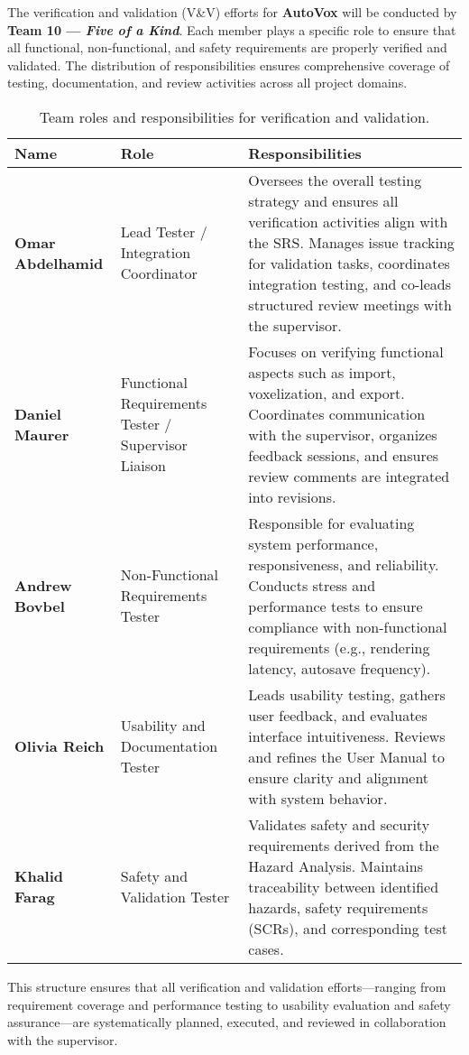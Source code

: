 \documentclass[12pt, titlepage]{article}
\begin{document}
The verification and validation (V\&V) efforts for \textbf{AutoVox} will be conducted by \textbf{Team 10 --- \textit{Five of a Kind}}. Each member plays a specific role to ensure that all functional, non-functional, and safety requirements are properly verified and validated. The distribution of responsibilities ensures comprehensive coverage of testing, documentation, and review activities across all project domains.

\begin{table}[H]
\centering
\begin{tabular}{|p{3.5cm}|p{4cm}|p{7cm}|}
\hline
\textbf{Name} & \textbf{Role} & \textbf{Responsibilities} \\
\hline
\textbf{Omar Abdelhamid} & Lead Tester / Integration Coordinator & Oversees the overall testing strategy and ensures all verification activities align with the SRS. Manages issue tracking for validation tasks, coordinates integration testing, and co-leads structured review meetings with the supervisor. \\
\hline
\textbf{Daniel Maurer} & Functional Requirements Tester / Supervisor Liaison & Focuses on verifying functional aspects such as import, voxelization, and export. Coordinates communication with the supervisor, organizes feedback sessions, and ensures review comments are integrated into revisions. \\
\hline
\textbf{Andrew Bovbel} & Non-Functional Requirements Tester & Responsible for evaluating system performance, responsiveness, and reliability. Conducts stress and performance tests to ensure compliance with non-functional requirements (e.g., rendering latency, autosave frequency). \\
\hline
\textbf{Olivia Reich} & Usability and Documentation Tester & Leads usability testing, gathers user feedback, and evaluates interface intuitiveness. Reviews and refines the User Manual to ensure clarity and alignment with system behavior. \\
\hline
\textbf{Khalid Farag} & Safety and Validation Tester & Validates safety and security requirements derived from the Hazard Analysis. Maintains traceability between identified hazards, safety requirements (SCRs), and corresponding test cases. \\
\hline
\end{tabular}
\caption{Team roles and responsibilities for verification and validation.}
\end{table}

This structure ensures that all verification and validation efforts—ranging from requirement coverage and performance testing to usability evaluation and safety assurance—are systematically planned, executed, and reviewed in collaboration with the supervisor.
\end{document}
